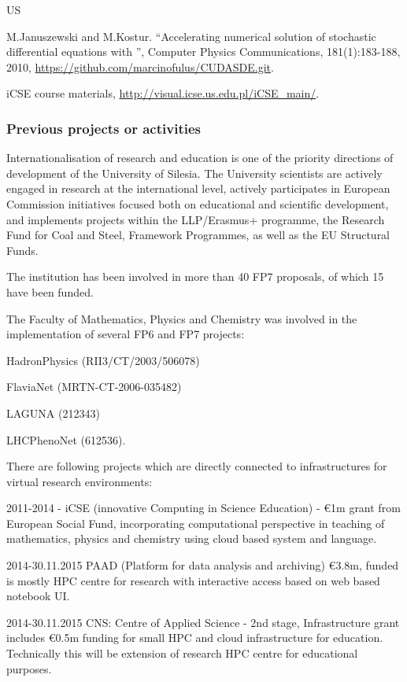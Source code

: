 \begin{sitedescription}{US}
\begin{compactenum}
\item  M.Januszewski and M.Kostur. ``Accelerating numerical solution of stochastic differential equations
with '',  Computer Physics Communications, 181(1):183-188, 2010,
\url{https://github.com/marcinofulus/CUDASDE.git}.

\item iCSE course materials, \url{http://visual.icse.us.edu.pl/iCSE\_main/}.

\end{compactenum}

\subsubsection*{Previous projects or activities}

Internationalisation of research and education is one of the priority
directions of development of the University of Silesia. The University
scientists are actively engaged in research at the international
level, actively participates in European Commission initiatives
focused both on educational and scientific development, and implements
projects within the LLP/Erasmus+ programme, the Research Fund for Coal
and Steel, Framework Programmes, as well as the EU Structural Funds.

The institution has been involved in more than 40 FP7 proposals, of
which 15 have been funded.

The Faculty of Mathematics, Physics and Chemistry was involved in the
implementation of several FP6 and FP7 projects:
\begin{compactenum}
\item HadronPhysics (RII3/CT/2003/506078)
\item FlaviaNet (MRTN-CT-2006-035482)
\item LAGUNA (212343)
\item LHCPhenoNet (612536). 
\end{compactenum}

There are following projects which are directly connected to
infrastructures for virtual research environments:

\begin{compactenum}
\item 2011-2014 - iCSE (innovative Computing in Science Education) -
  \euro 1m grant from European Social Fund, incorporating
  computational perspective in teaching of mathematics, physics and
  chemistry using cloud based \Sage system and \Python language.
\item 2014-30.11.2015 PAAD (Platform for data analysis and archiving) 
\euro 3.8m, funded is mostly HPC centre for research with
  interactive access based on web based notebook UI.
\item 2014-30.11.2015 CNS: Centre of Applied Science - 2nd stage,
  Infrastructure grant includes \euro 0.5m funding for small HPC and
  cloud infrastructure for education. Technically this will be
  extension of research HPC centre for educational purposes.
\end{compactenum}




\end{sitedescription}
